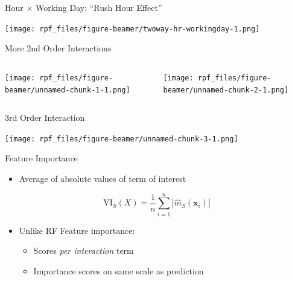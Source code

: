 \documentclass[aspectratio=169,12pt]{beamer}
\providecommand{\tightlist}{%
  \setlength{\itemsep}{2pt}\setlength{\parskip}{0pt}}
\begin{document}
\begin{frame}{Hour \(\times\) Working Day: ``Rush Hour Effect''}
\label{hour-times-working-day-rush-hour-effect}
\begin{center}
\texttt{[image: rpf\_files/figure-beamer/twoway-hr-workingday-1.png]}
\end{center}
\end{frame}

\begin{frame}{More 2nd Order Interactions}
\label{more-2nd-order-interactions}
\begin{columns}[T]
\begin{column}{0.5\linewidth}
\begin{center}
\texttt{[image: rpf\_files/figure-beamer/unnamed-chunk-1-1.png]}
\end{center}
\end{column}

\pause

\begin{column}{0.5\linewidth}
\begin{center}
\texttt{[image: rpf\_files/figure-beamer/unnamed-chunk-2-1.png]}
\end{center}
\end{column}
\end{columns}
\end{frame}

\begin{frame}{3rd Order Interaction}
\label{rd-order-interaction}
\begin{center}
\texttt{[image: rpf\_files/figure-beamer/unnamed-chunk-3-1.png]}
\end{center}
\end{frame}

\begin{frame}{Feature Importance}
\label{feature-importance}
\begin{itemize}[<+->]
\tightlist
\item
  Average of absolute values of term of interest
\end{itemize}

\pause

\[\mathrm{VI}_S(X) = \frac{1}{n} \sum_{i=1}^n |\hat{m}_S(\mathbf{x}_i)|\]

\begin{itemize}[<+->]
\tightlist
\item
  Unlike RF Feature importance:

  \begin{itemize}[<+->]
  \tightlist
  \item
    Scores \emph{per interaction} term
  \item
    Importance scores on same scale as prediction
  \end{itemize}
\end{itemize}
\end{frame}
\end{document}
